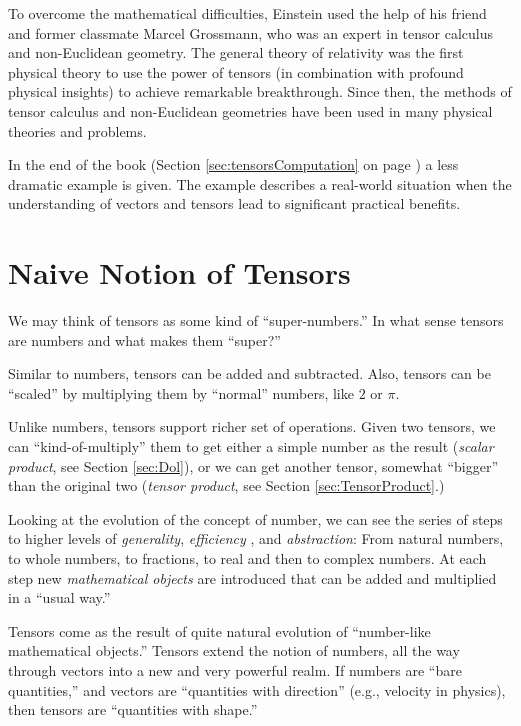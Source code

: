 To overcome the mathematical difficulties, Einstein used the help of
his friend and former classmate Marcel Grossmann, who was an
expert in tensor calculus and non-Euclidean geometry. The general
theory of relativity was the first physical theory to use the power of
tensors (in combination with profound physical insights) to achieve
remarkable breakthrough. Since then, the
methods of tensor calculus and non-Euclidean geometries have been used
in many physical theories and problems.

In the end of the book (Section \ref{sec:tensorsComputation} on page
\pageref{sec:tensorsComputation}) a less dramatic example is
given. The example describes a real-world situation when the
understanding of vectors and tensors lead to significant practical
benefits.

\section{Naive Notion of Tensors}\label{sec:TensorNaive}
We may think of tensors as some kind of ``super-numbers.'' In what
sense tensors are numbers and what makes them ``super?''

Similar to numbers, tensors can be added and subtracted. Also, tensors
can be ``scaled'' by multiplying them by ``normal'' numbers, like $2$
or $\pi$.

Unlike numbers, tensors support richer set of operations. Given two
tensors, we can ``kind-of-multiply'' them to get either a simple
number as the result (\emph{scalar product}, see Section
\ref{sec:Dol}), or we can get another
tensor, somewhat ``bigger'' than the original two (\emph{tensor
product}, see Section \ref{sec:TensorProduct}.)

Looking at the evolution of the concept of number, we can
see the series of steps to higher levels of \emph{generality},
\emph{efficiency} , and
\emph{abstraction}: From natural numbers, to whole numbers, to
fractions, to real and then to complex numbers. At each step new
\emph{mathematical objects} are introduced that can be added and
multiplied in a ``usual way.''

Tensors come as the result of quite natural evolution of
``number-like mathematical objects.'' Tensors extend the notion of
numbers, all the way through vectors into a new and very powerful
realm. If numbers are ``bare quantities,'' and vectors are
``quantities with direction'' (e.g., velocity in physics), then
tensors are ``quantities with shape.''

